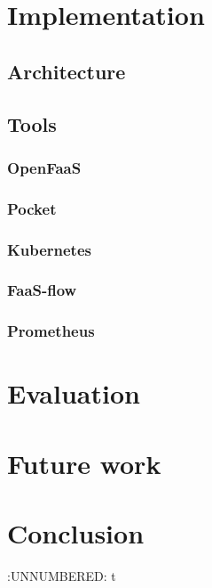 \documentclass[12pt,titlepage]{article}
\begin{document}
\section{Implementation}
\label{sec:org214f997}
\subsection{Architecture}
\label{sec:org80d1d1e}
\subsection{Tools}
\label{sec:org7232b31}
\subsubsection{OpenFaaS}
\label{sec:orge310fd3}
\subsubsection{Pocket}
\label{sec:org11f98b3}
\subsubsection{Kubernetes}
\label{sec:orga01c271}
\subsubsection{FaaS-flow}
\label{sec:org7d92976}
\subsubsection{Prometheus}
\label{sec:org947c0ac}
\section{Evaluation}
\label{sec:org6e18a0b}
\section{Future work}
\label{sec:org33598a8}
\section{Conclusion}
\label{sec:orgcdb24d3}


:UNNUMBERED: t
\end{document}
